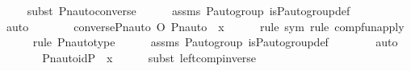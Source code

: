 \begin{isabellebody}
\ \ \ \ \isamarkupfalse%
{\isacharparenleft}{\kern0pt}subst\ Pn{\isacharunderscore}{\kern0pt}auto{\isacharunderscore}{\kern0pt}converse{\isacharparenright}{\kern0pt}\isanewline
\ \ \ \ \isamarkupfalse%
\ assms\ {\isasymG}{\isacharunderscore}{\kern0pt}P{\isacharunderscore}{\kern0pt}auto{\isacharunderscore}{\kern0pt}group\ is{\isacharunderscore}{\kern0pt}P{\isacharunderscore}{\kern0pt}auto{\isacharunderscore}{\kern0pt}group{\isacharunderscore}{\kern0pt}def\ \isanewline
\ \ \ \ \isamarkupfalse%
\ auto\isanewline
\ \ \isamarkupfalse%
\ \isamarkupfalse%
\ {\isachardoublequoteopen}{\isachardot}{\kern0pt}{\isachardot}{\kern0pt}{\isachardot}{\kern0pt}\ {\isacharequal}{\kern0pt}\ {\isacharparenleft}{\kern0pt}converse{\isacharparenleft}{\kern0pt}Pn{\isacharunderscore}{\kern0pt}auto{\isacharparenleft}{\kern0pt}{\isasympi}{\isacharparenright}{\kern0pt}{\isacharparenright}{\kern0pt}\ O\ Pn{\isacharunderscore}{\kern0pt}auto{\isacharparenleft}{\kern0pt}{\isasympi}{\isacharparenright}{\kern0pt}{\isacharparenright}{\kern0pt}\ {\isacharbackquote}{\kern0pt}\ x{\isachardoublequoteclose}\ \isanewline
\ \ \ \ \isamarkupfalse%
{\isacharparenleft}{\kern0pt}rule\ sym{\isacharcomma}{\kern0pt}\ rule\ comp{\isacharunderscore}{\kern0pt}fun{\isacharunderscore}{\kern0pt}apply{\isacharparenright}{\kern0pt}\isanewline
\ \ \ \ \ \isamarkupfalse%
{\isacharparenleft}{\kern0pt}rule\ Pn{\isacharunderscore}{\kern0pt}auto{\isacharunderscore}{\kern0pt}type{\isacharparenright}{\kern0pt}\isanewline
\ \ \ \ \isamarkupfalse%
\ assms\ {\isasymG}{\isacharunderscore}{\kern0pt}P{\isacharunderscore}{\kern0pt}auto{\isacharunderscore}{\kern0pt}group\ is{\isacharunderscore}{\kern0pt}P{\isacharunderscore}{\kern0pt}auto{\isacharunderscore}{\kern0pt}group{\isacharunderscore}{\kern0pt}def\ \ \isanewline
\ \ \ \ \isamarkupfalse%
\ auto\ \isanewline
\ \ \isamarkupfalse%
\ \isamarkupfalse%
\ {\isachardoublequoteopen}{\isachardot}{\kern0pt}{\isachardot}{\kern0pt}{\isachardot}{\kern0pt}\ {\isacharequal}{\kern0pt}\ Pn{\isacharunderscore}{\kern0pt}auto{\isacharparenleft}{\kern0pt}id{\isacharparenleft}{\kern0pt}P{\isacharparenright}{\kern0pt}{\isacharparenright}{\kern0pt}\ {\isacharbackquote}{\kern0pt}\ x{\isachardoublequoteclose}\ \isanewline
\ \ \ \ \isamarkupfalse%
{\isacharparenleft}{\kern0pt}subst\ left{\isacharunderscore}{\kern0pt}comp{\isacharunderscore}{\kern0pt}inverse{\isacharparenright}{\kern0pt}\isanewline

\end{isabellebody}
